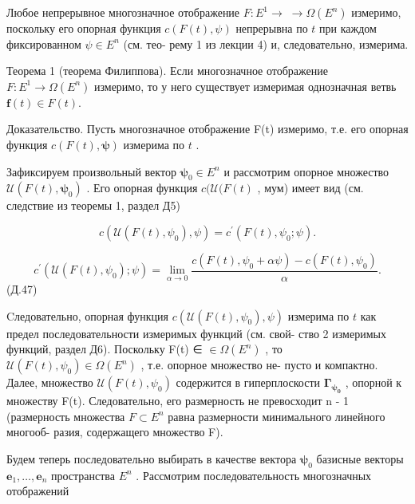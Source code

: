 \documentclass[8pt]{extarticle}
\begin{document}
Любое непрерывное многозначное отображение \(F : {E}^{1} \rightarrow \; \rightarrow  \Omega \left( {E}^{n}\right)\) измеримо, поскольку его опорная функция \(c\left( {F\left( t\right) ,\psi }\right)\) непрерывна по \(t\) при каждом фиксированном \(\psi  \in  {E}^{n}\) (см. тео- рему 1 из лекции 4) и, следовательно, измерима.

Теорема 1 (теорема Филиппова). Если многозначное отображение \(F : {E}^{1} \rightarrow  \Omega \left( {E}^{n}\right)\) измеримо, то у него существует измеримая однозначная ветвь \(\mathbf{f}\left( t\right)  \in  F\left( t\right)\).

Доказательство. Пусть многозначное отображение F(t) измеримо, т.е. его опорная функция \(c\left( {F\left( t\right) ,\mathbf{\psi }}\right)\) измерима по \(t\) .

Зафиксируем произвольный вектор \({\mathbf{\psi }}_{0} \in  {E}^{n}\) и рассмотрим опорное множество \(\mathcal{U}\left( {F\left( t\right) ,{\mathbf{\psi }}_{0}}\right)\) . Его опорная функция \(c(\mathcal{U}(F\left( t\right)\) , мум) имеет вид (см. следствие из теоремы 1, раздел Д5)

\[
c\left( {\mathcal{U}\left( {F\left( t\right) ,{\psi }_{0}}\right) ,\psi }\right)  = {c}^{\prime }\left( {F\left( t\right) ,{\psi }_{0};\psi }\right) .
\]

\[
{c}^{\prime }\left( {\mathcal{U}\left( {F\left( t\right) ,{\psi }_{0}}\right) ;\psi }\right)  = \mathop{\lim }\limits_{{\alpha  \rightarrow  0}}\frac{c\left( {F\left( t\right) ,{\psi }_{0} + {\alpha \psi }}\right)  - c\left( {F\left( t\right) ,{\psi }_{0}}\right) }{\alpha }.
\]
 (Д.47)

Cледовательно, опорная функция \(c\left( {\mathcal{U}\left( {F\left( t\right) ,{\psi }_{0}}\right) ,\psi }\right)\) измерима по \(t\) как предел последовательности измеримых функций (см. свой- ство 2 измеримых функций, раздел Д6). Поскольку F(t) ∈ \(\in  \Omega \left( {E}^{n}\right)\) , то \(\mathcal{U}\left( {F\left( t\right) ,{\psi }_{0}}\right)  \in  \Omega \left( {E}^{n}\right)\) , т.е. опорное множество не- пусто и компактно. Далее, множество \(\mathcal{U}\left( {F\left( t\right) ,{\psi }_{0}}\right)\) содержится в гиперплоскости \({\mathbf{\Gamma }}_{{\mathbf{\psi }}_{\mathbf{0}}}\) , опорной к множеству F(t). Следовательно, его размерность не превосходит n - 1 (размерность множества \(F \subset  {E}^{n}\) равна размерности минимального линейного многооб- разия, содержащего множество F).

Будем теперь последовательно выбирать в качестве вектора \({\mathbf{\psi }}_{0}\) базисные векторы \({\mathbf{e}}_{1},\ldots ,{\mathbf{e}}_{n}\) пространства \({E}^{n}\) . Рассмотрим последовательность многозначных отображений
\end{document}
